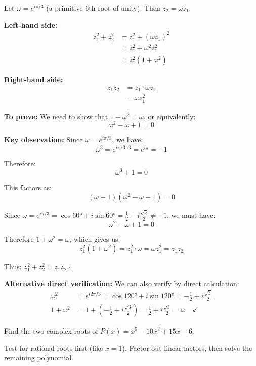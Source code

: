 \begin{solution}[Sketch]
Let $\omega = e^{i\pi/3}$ (a primitive 6th root of unity). Then $z_2 = \omega z_1$.

\textbf{Left-hand side:}
\begin{align*}
z_1^2 + z_2^2 &= z_1^2 + (\omega z_1)^2\\
&= z_1^2 + \omega^2 z_1^2\\
&= z_1^2(1 + \omega^2)
\end{align*}

\textbf{Right-hand side:}
\begin{align*}
z_1 z_2 &= z_1 \cdot \omega z_1\\
&= \omega z_1^2
\end{align*}

\textbf{To prove:} We need to show that $1 + \omega^2 = \omega$, or equivalently:
\[
\omega^2 - \omega + 1 = 0
\]

\textbf{Key observation:} Since $\omega = e^{i\pi/3}$, we have:
\[
\omega^3 = e^{i\pi/3 \cdot 3} = e^{i\pi} = -1
\]

Therefore:
\[
\omega^3 + 1 = 0
\]

This factors as:
\[
(\omega + 1)(\omega^2 - \omega + 1) = 0
\]

Since $\omega = e^{i\pi/3} = \cos 60° + i\sin 60° = \frac{1}{2} + i\frac{\sqrt{3}}{2} \neq -1$, we must have:
\[
\omega^2 - \omega + 1 = 0
\]

Therefore $1 + \omega^2 = \omega$, which gives us:
\[
z_1^2(1 + \omega^2) = z_1^2 \cdot \omega = \omega z_1^2 = z_1z_2
\]

Thus: $z_1^2 + z_2^2 = z_1 z_2$ \quad $\square$

\textbf{Alternative direct verification:} We can also verify by direct calculation:
\begin{align*}
\omega^2 &= e^{i2\pi/3} = \cos 120° + i\sin 120° = -\frac{1}{2} + i\frac{\sqrt{3}}{2}\\
1 + \omega^2 &= 1 + \left(-\frac{1}{2} + i\frac{\sqrt{3}}{2}\right) = \frac{1}{2} + i\frac{\sqrt{3}}{2} = \omega \quad \checkmark
\end{align*}

\end{solution}

\begin{problem}
Find the two complex roots of $P(x) = x^5 - 10x^2 + 15x - 6$.
\end{problem}

\begin{hint}
Test for rational roots first (like $x=1$). Factor out linear factors, then solve the remaining polynomial.
\end{hint}

